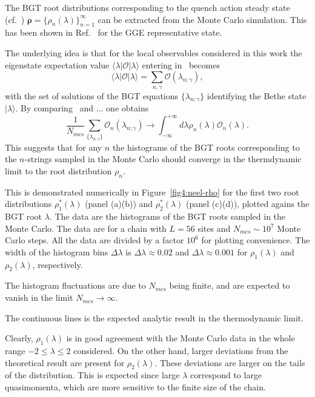 \documentclass[11pt]{iopart}
\begin{document}
The BGT root distributions corresponding to the quench action steady state 
(cf.~) $\pmb{\rho}=\{\rho_n(\lambda)\}_{n=1}^{\infty}$ can be extracted 
from the Monte Carlo simulation.  This has been shown in Ref.~\cite{alba-2015} for 
the GGE representative state. 

The underlying idea is that for the local observables considered in this 
work the eigenstate expectation value $\langle\lambda|{\mathcal O}|\lambda\rangle$
entering in~ becomes
%
\begin{equation}
\langle\lambda|{\mathcal O}|\lambda\rangle=\sum\limits_{n,\gamma}{\mathcal O}
(\lambda_{n;\gamma}), 
\end{equation}
%
with the set of solutions of the BGT equations $\{\lambda_{n;\gamma}\}$ identifying 
the Bethe state $|\lambda\rangle$. 
By comparing~ and ... one obtains
%
\begin{equation}
\frac{1}{N_{mcs}}\sum\limits_{\{\lambda_{n;\gamma}\}}{\mathcal O}_n(\lambda_{n;\gamma})
\to\int_{-\infty}^{+\infty}d\lambda\rho_{n}(\lambda){\mathcal O}_n(\lambda). 
\end{equation}
%
This suggests that for any $n$ the histograms of the BGT roots corresponding to the 
$n$-strings sampled in the Monte Carlo should converge in the thermdynamic limit to 
the root distribution $\rho_n$. 

This is demonstrated numerically in Figure~\ref{fig4:neel-rho} for the first two root 
distributions $\rho^*_1(\lambda)$ (panel (a)(b)) and $\rho^*_2(\lambda)$ (panel 
(c)(d)), plotted agains 
the BGT root $\lambda$. The data are the histograms of the BGT roots sampled 
in the Monte Carlo. The data are for a chain with $L=56$ sites and 
$N_{mcs}\sim 10^7$ Monte Carlo steps. All the data are divided by a factor 
$10^6$ for plotting convenience. The width of the histogram bins $\Delta\lambda$ 
is $\Delta\lambda\approx0.02$ and $\Delta\lambda\approx0.001$ for $\rho_1(\lambda)$ 
and $\rho_2(\lambda)$, respectively. 

The histogram fluctuations are due to $N_{mcs}$ being finite, and are expected 
to vanish in the limit $N_{mcs}\to\infty$. 

The continuous lines is the expected analytic result in the thermodynamic limit. 

Clearly, $\rho_1(\lambda)$ is in good agreement with the Monte Carlo data in the 
whole range $-2\le\lambda\le2$ considered. 
On the other hand, larger deviations from the theoretical result are present 
for $\rho_2(\lambda)$. These deviations are larger on the tails of the 
distribution. This is expected since large $\lambda$ correspond to large 
quasimomenta, which are more sensitive to the finite size of the chain. 
\end{document}
